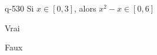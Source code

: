 \begin{truefalse}{q-530}
Si $x\in[0,3]$, alors $x^2-x\in[0,6]$
\item Vrai
\item* Faux
\end{truefalse}

